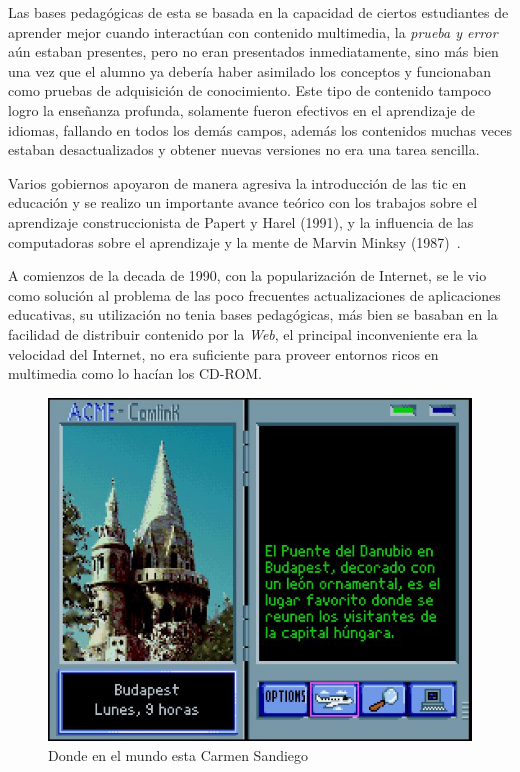 Las bases pedagógicas de esta se basada en la capacidad de ciertos estudiantes
de aprender mejor cuando interactúan con contenido multimedia, la \emph{prueba y
	error} aún estaban presentes, pero no eran presentados inmediatamente,
sino más bien una vez que el alumno ya debería haber asimilado los conceptos y
funcionaban como pruebas de adquisición de conocimiento. Este tipo de contenido
tampoco logro la enseñanza profunda, solamente fueron efectivos en el
aprendizaje de idiomas, fallando en todos los demás campos\cite{leinonen:ict},
además los contenidos muchas veces estaban desactualizados y obtener nuevas
versiones no era una tarea sencilla.

Varios gobiernos apoyaron de manera agresiva la introducción de las \Gls{tic} en
educación\cite{mcdougall2006theory} y se realizo un importante avance teórico
con los trabajos sobre el aprendizaje construccionista de Papert y Harel (1991),
y la influencia de las computadoras sobre el aprendizaje y la mente de Marvin
Minksy (1987)~\cite{mcdougall2006theory}.

A comienzos de la decada de 1990, con la popularización de Internet, se le vio
como solución al problema de las poco frecuentes actualizaciones de aplicaciones
educativas, su utilización no tenia bases pedagógicas, más bien se basaban en la
facilidad de distribuir contenido por la \emph{Web}, el principal inconveniente
era la velocidad del Internet, no era suficiente para proveer entornos ricos en
multimedia como lo hacían los CD-ROM\cite{leinonen:ict}.

\begin{figure}[ht!] 
	\centering 
	\includegraphics[scale=0.5]{tics/carmen.jpg}
	\caption{Donde en el mundo esta Carmen Sandiego} 
	\label{fig:carmen}
\end{figure}

